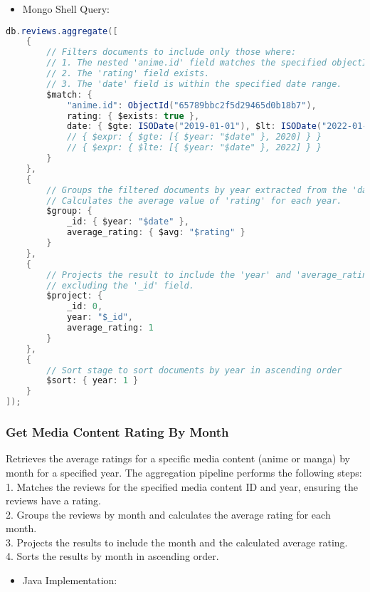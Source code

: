 \begin{itemize}
    \item Mongo Shell Query:
\end{itemize}

\begin{mdframed}[style=customstyle2]
    \begin{lstlisting}[language=java, backgroundcolor=\color{white}]
db.reviews.aggregate([
    {
        // Filters documents to include only those where:
        // 1. The nested 'anime.id' field matches the specified objectId.
        // 2. The 'rating' field exists.
        // 3. The 'date' field is within the specified date range.
        $match: {
            "anime.id": ObjectId("65789bbc2f5d29465d0b18b7"),
            rating: { $exists: true },
            date: { $gte: ISODate("2019-01-01"), $lt: ISODate("2022-01-01") }
            // { $expr: { $gte: [{ $year: "$date" }, 2020] } }
            // { $expr: { $lte: [{ $year: "$date" }, 2022] } }
        }
    },
    {
        // Groups the filtered documents by year extracted from the 'date' field.
        // Calculates the average value of 'rating' for each year.
        $group: {
            _id: { $year: "$date" },
            average_rating: { $avg: "$rating" }
        }
    },
    {
        // Projects the result to include the 'year' and 'average_rating' fields,
        // excluding the '_id' field.
        $project: {
            _id: 0,
            year: "$_id",
            average_rating: 1
        }
    },
    {
        // Sort stage to sort documents by year in ascending order
        $sort: { year: 1 }
    }
]);\end{lstlisting}
\end{mdframed}

\subsubsection*{Get Media Content Rating By Month}

Retrieves the average ratings for a specific media content (anime or manga) by month for a specified year.
The aggregation pipeline performs the following steps:\\
1. Matches the reviews for the specified media content ID and year, ensuring the reviews have a rating.\\
2. Groups the reviews by month and calculates the average rating for each month.\\
3. Projects the results to include the month and the calculated average rating.\\
4. Sorts the results by month in ascending order.
\begin{itemize}
    \item Java Implementation:
\end{itemize}

